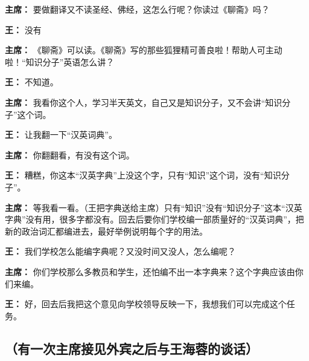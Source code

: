 \begin{list}{}
\item[\textbf{主席：}] 要做翻译又不读圣经、佛经，这怎么行呢？你读过《聊斋》吗？

\item[\textbf{王：}] 没有

\item[\textbf{主席：}] 《聊斋》可以读。《聊斋》写的那些狐狸精可善良啦！帮助人可主动啦！“知识分子”英语怎么讲？

\item[\textbf{王：}] 不知道。

\item[\textbf{主席：}] 我看你这个人，学习半天英文，自己又是知识分子，又不会讲“知识分子”这个词。

\item[\textbf{王：}] 让我翻一下“汉英词典”。

\item[\textbf{主席：}] 你翻翻看，有没有这个词。

\item[\textbf{王：}] 糟糕，你这本“汉英字典”上没这个字，只有“知识”这个词，没有“知识分子”。

\item[\textbf{主席：}] 等我看一看。（王把字典送给主席）只有“知识”没有“知识分子”这本“汉英字典”没有用，很多字都没有。回去后要你们学校编一部质量好的“汉英词典”，把新的政治词汇都编进去，最好举例说明每个字的用法。

\item[\textbf{王：}] 我们学校怎么能编字典呢？又没时间又没人，怎么编呢？

\item[\textbf{主席：}] 你们学校那么多教员和学生，还怕编不出一本字典来？这个字典应该由你们来编。

\item[\textbf{王：}] 好，回去后我把这个意见向学校领导反映一下，我想我们可以完成这个任务。

\end{list}

\subsection{（有一次主席接见外宾之后与王海蓉的谈话）}

